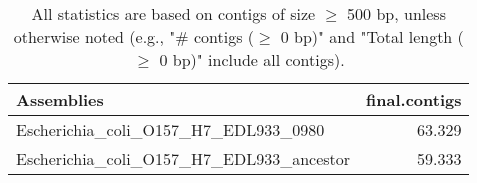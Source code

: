 \documentclass[12pt,a4paper]{article}
\begin{document}
\begin{table}[ht]
\begin{center}
\caption{All statistics are based on contigs of size $\geq$ 500 bp, unless otherwise noted (e.g., "\# contigs ($\geq$ 0 bp)" and "Total length ($\geq$ 0 bp)" include all contigs).}
\begin{tabular}{|l*{1}{|r}|}
\hline
Assemblies & final.contigs \\ \hline
Escherichia\_coli\_O157\_H7\_EDL933\_0980 & 63.329 \\ \hline
Escherichia\_coli\_O157\_H7\_EDL933\_ancestor & 59.333 \\ \hline
\end{tabular}
\end{center}
\end{table}
\end{document}
